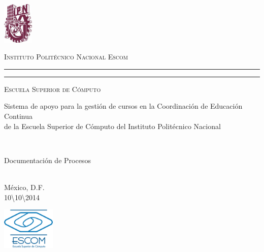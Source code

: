 \newcommand{\grupo}[1]{\def\elgrupo{#1}}
\newcommand{\fecha}[1]{\def\lafecha{#1}}
\newcommand{\materia}[1]{\def\lamateria{#1}}
\newcommand{\lugar}[1]{\def\ellugar{#1}}

\grupo{}
\fecha{10\textbackslash10\textbackslash2014}
\materia{Ingeniería de Software}
\lugar{México, D.F.}

\thispagestyle{empty}

\hskip-1.5cm
\begin{minipage}[c][10cm][s]{4cm} 
  \begin{center}
    \includegraphics[height=2cm]{images/ipn}\\[10pt]
  \end{center}
\end{minipage}\quad
\begin{minipage}[c][9.5cm][s]{10cm}
  \begin{center}
    {\large \scshape Instituto Polit\'ecnico Nacional Escom}
    \vspace{.3cm}
    \hrule height2pt
    \vspace{.1cm}
    \hrule height1pt
    \vspace{.3cm}
    {\scshape Escuela Superior de C\'omputo}
    \vspace{3cm}
    \vspace{2cm}
    \parbox{9cm}{\huge \centering Sistema de apoyo para la gestión de cursos en la Coordinación de Educación Continua\\ de la Escuela Superior de Cómputo del Instituto Politécnico Nacional\\}\\[8pt]
    \vspace{2cm}
    \parbox{9cm}{\huge \centering Documentación de Procesos}\\[6pt]
    \vspace{2cm}
    \vspace{2cm}
    \ellugar\\[8pt]
    \lafecha\\[8pt]
  \end{center}
\end{minipage}
\begin{minipage}[c][10cm][s]{5cm} 
  \begin{center}
    \includegraphics[height=2cm]{images/logo}\\[10pt]
  \end{center}
\end{minipage}\quad


